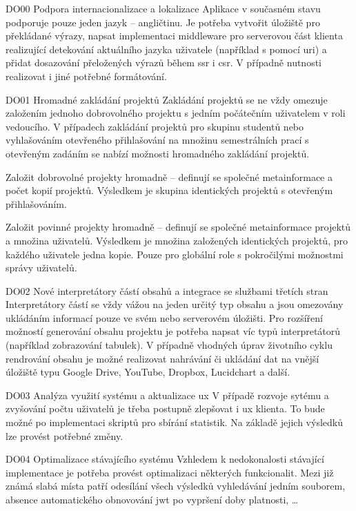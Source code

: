 \begin{dl}   

   \item[DO00 Podpora internacionalizace a lokalizace]
   Aplikace v současném stavu podporuje pouze jeden jazyk -- angličtinu. Je potřeba vytvořit úložiště pro překládané výrazy, napsat implementaci middleware pro serverovou část klienta realizující detekování aktuálního jazyka uživatele (například s pomocí \gls{uri}) a přidat dosazování přeložených výrazů během \gls{ssr} i \gls{csr}. V případně nutnosti realizovat i jiné potřebné formátování.
    
   \item[DO01 Hromadné zakládání projektů] 
   Zakládání projektů se ne vždy omezuje založením jednoho dobrovolného projektu s jedním počátečním uživatelem v roli vedoucího. V případech zakládání projektů pro skupinu studentů nebo vyhlašováním otevřeného přihlašování na množinu semestrálních prací s otevřeným zadáním se nabízí možnosti hromadného zakládání projektů.

   Založit dobrovolné projekty hromadně -- definují se společné metainformace a počet kopií projektů. Výsledkem je skupina identických projektů s otevřeným přihlašováním.

   Založit povinné projekty hromadně -- definují se společné metainformace projektů a množina uživatelů. Výsledkem je množina založených identických projektů, pro každého uživatele jedna kopie. Pouze pro globální role s pokročilými možnostmi správy uživatelů.

   \item[DO02 Nové interpretátory částí obsahů a integrace se službami třetích stran]
   Interpretátory částí se vždy vážou na jeden určitý typ obsahu a jsou omezovány ukládáním informací pouze ve svém nebo serverovém úložišti. Pro rozšíření možností generování obsahu projektu je potřeba napsat víc typů interpretátorů (například zobrazování tabulek). V případně vhodných úprav životního cyklu rendrování obsahu je možné realizovat nahrávání či ukládání dat na vnější úložiště typu Google Drive, YouTube, Dropbox, Lucidchart a další.

   \item[DO03 Analýza využití systému a aktualizace \gls{ux}]
   V případě rozvoje sytému a zvyšování počtu uživatelů je třeba postupně zlepšovat i \gls{ux} klienta. To bude možné po implementaci skriptů pro sbírání statistik. Na základě jejich výsledků lze provést potřebné změny.
   
   \item[DO04 Optimalizace stávajícího systému]
   Vzhledem k nedokonalosti stávající implementace je potřeba provést optimalizaci některých funkcionalit. Mezi již známá slabá místa patří odesílání všech výsledků vyhledávání jedním souborem, absence automatického obnovování \gls{jwt} po vypršení doby platnosti, \dots
   

\end{dl}
